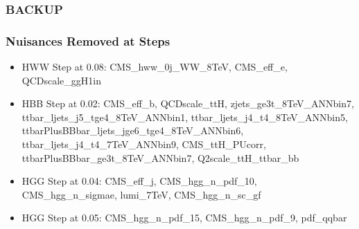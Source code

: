 \documentclass[hyperref=colorlinks]{beamer}
\begin{document}
\begin{frame}
  \frametitle{BACKUP}
\end{frame}

\begin{frame}
  \frametitle{Nuisances Removed at Steps}
  \begin{itemize}
  \item HWW Step at 0.08: CMS\_hww\_0j\_WW\_8TeV, CMS\_eff\_e, QCDscale\_ggH1in
  \item HBB Step at 0.02: CMS\_eff\_b, QCDscale\_ttH, zjets\_ge3t\_8TeV\_ANNbin7, ttbar\_ljets\_j5\_tge4\_8TeV\_ANNbin1, ttbar\_ljets\_j4\_t4\_8TeV\_ANNbin5, ttbarPlusBBbar\_ljets\_jge6\_tge4\_8TeV\_ANNbin6, ttbar\_ljets\_j4\_t4\_7TeV\_ANNbin9, CMS\_ttH\_PUcorr, ttbarPlusBBbar\_ge3t\_8TeV\_ANNbin7, Q2scale\_ttH\_ttbar\_bb
  \item HGG Step at 0.04: CMS\_eff\_j, CMS\_hgg\_n\_pdf\_10, CMS\_hgg\_n\_sigmae, lumi\_7TeV, CMS\_hgg\_n\_sc\_gf
  \item HGG Step at 0.05: CMS\_hgg\_n\_pdf\_15, CMS\_hgg\_n\_pdf\_9, pdf\_qqbar
  \end{itemize}
\end{frame}

{
  
}
\end{document}

